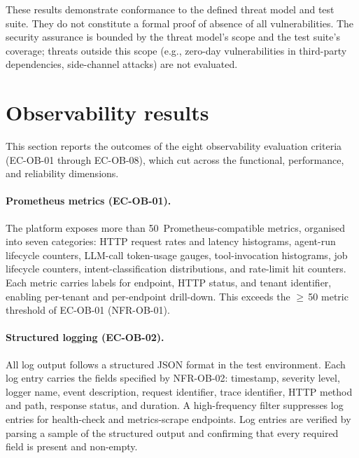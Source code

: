 \documentclass[a4paper]{sapthesis}
\begin{document}
These results demonstrate conformance to the defined threat model and
test suite.  They do not constitute a formal proof of absence of all
vulnerabilities.  The security assurance is bounded by the threat model's
scope and the test suite's coverage; threats outside this scope (e.g.,
zero-day vulnerabilities in third-party dependencies, side-channel
attacks) are not evaluated.


\section{Observability results}
\label{sec:observability-results}

This section reports the outcomes of the eight observability evaluation
criteria (EC-OB-01 through EC-OB-08), which cut across the functional,
performance, and reliability dimensions.

\paragraph{Prometheus metrics (EC-OB-01).}
The platform exposes more than 50~Prometheus-compatible metrics, organised
into seven categories: HTTP request rates and latency histograms,
agent-run lifecycle counters, LLM-call token-usage gauges, tool-invocation
histograms, job lifecycle counters, intent-classification distributions,
and rate-limit hit counters.  Each metric carries labels for endpoint,
HTTP status, and tenant identifier, enabling per-tenant and per-endpoint
drill-down.  This exceeds the $\geq$\,50 metric threshold of EC-OB-01
(NFR-OB-01).

\paragraph{Structured logging (EC-OB-02).}
All log output follows a structured JSON format in the test environment.
Each log entry carries the fields specified by NFR-OB-02: timestamp,
severity level, logger name, event description, request identifier, trace
identifier, HTTP method and path, response status, and duration.  A
high-frequency filter suppresses log entries for health-check and
metrics-scrape endpoints.  Log entries are verified by parsing a sample
of the structured output and confirming that every required field is
present and non-empty.
\end{document}
